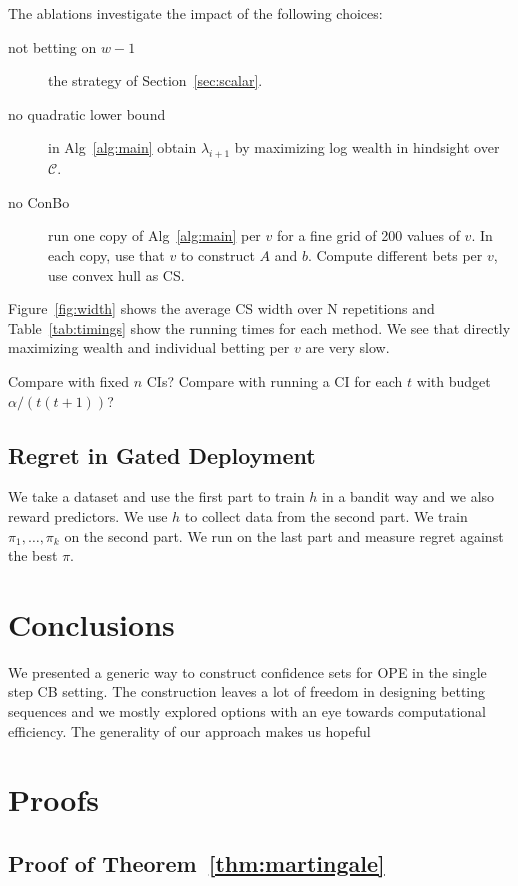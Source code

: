 The ablations investigate the impact of the following choices:
\begin{description}
\item[not betting on $w-1$] the strategy of Section~\ref{sec:scalar}.
\item[no quadratic lower bound] in Alg~\ref{alg:main} obtain $\lambda_{i+1}$
by maximizing log wealth in hindsight over $\mathcal{C}$.
\item[no ConBo] run one copy of Alg~\ref{alg:main} per $v$ for a fine 
grid of 200 values of $v$. In each copy, use that $v$ to construct $A$ and $b$.
Compute different bets per $v$, use convex hull as CS.
\end{description}
Figure~\ref{fig:width} shows the 
average CS width over N repetitions and Table~\ref{tab:timings}
show the running times for each method. We see that directly 
maximizing wealth and individual betting per $v$ are very slow.

Compare with fixed $n$ CIs?  
Compare with running a CI for each $t$ with budget $\alpha/(t(t+1))$?  

\subsection{Regret in Gated Deployment}
We take a dataset and use the first part to train $h$ in a 
bandit way and we also reward predictors. We use 
$h$ to collect data from the second part. We train
$\pi_1,\ldots, \pi_k$ on the second part. We run 
on the last part and measure regret against the
best $\pi$. 

\section{Conclusions}
We presented a generic way to construct confidence sets for OPE in the single
step CB setting. The construction leaves a lot of freedom in designing betting
sequences and we mostly explored options with an eye towards computational
efficiency. The generality of our approach makes us hopeful 



\newpage
\onecolumn
\appendix
\section{Proofs}

\subsection{Proof of Theorem~\ref{thm:martingale}}

